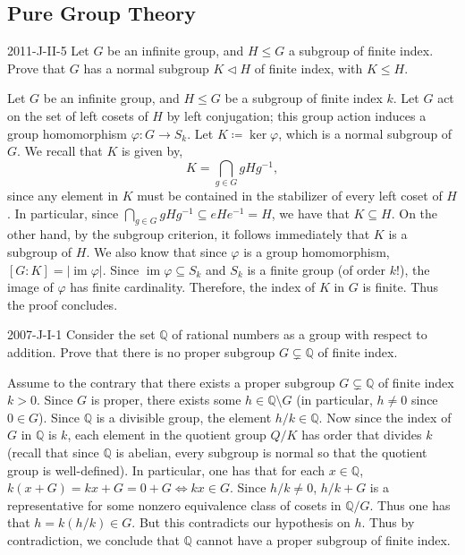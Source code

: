 \documentclass{article}
\begin{document}
	\subsection{Pure Group Theory}
	\begin{prb}{2011-J-II-5}
		Let $G$ be an infinite group, and $H \leq G$ a subgroup of finite index. Prove that $G$ has a normal subgroup $K \triangleleft H$ of finite index, with $K \leq H$. 
	\end{prb}
	Let $G$ be an infinite group, and $H \leq G$ be a subgroup of finite index $k$. Let $G$ act on the set of left cosets of $H$ by left conjugation; this group action induces a group homomorphism $\varphi: G \to S_{k}$. Let $K \coloneqq \ker{\varphi}$, which is a normal subgroup of $G$. We recall that $K$ is given by, 
	\begin{equation*}
		K = \bigcap_{g \in G}gHg^{-1}, 
	\end{equation*}
	since any element in $K$ must be contained in the stabilizer of every left coset of $H$. In particular, since $\bigcap_{g \in G}gHg^{-1} \subseteq eHe^{-1} = H$, we have that $K \subseteq H$. On the other hand, by the subgroup criterion, it follows immediately that $K$ is a subgroup of $H$. We also know that since $\varphi$ is a group homomorphism, $[G:K] = |\operatorname{im}{\varphi}|$. Since $\operatorname{im}{\varphi} \subseteq S_{k}$ and $S_{k}$ is a finite group (of order $k!$), the image of $\varphi$ has finite cardinality. Therefore, the index of $K$ in $G$ is finite. Thus the proof concludes. 
	
	\begin{prb}{2007-J-I-1}
		Consider the set $\mathbb{Q}$ of rational numbers as a group with respect to addition. Prove that there is no proper subgroup $G \subsetneq \mathbb{Q}$ of finite index. 
	\end{prb}
	Assume to the contrary that there exists a proper subgroup $G \subsetneq \mathbb{Q}$ of finite index $k > 0$. Since $G$ is proper, there exists some $h \in \mathbb{Q}\setminus G$ (in particular, $h \neq 0$ since $0 \in G$). Since $\mathbb{Q}$ is a divisible group, the element $h/k \in \mathbb{Q}$. Now since the index of $G$ in $\mathbb{Q}$ is $k$, each element in the quotient group $Q/K$ has order that divides $k$ (recall that since $\mathbb{Q}$ is abelian, every subgroup is normal so that the quotient group is well-defined). In particular, one has that for each $x \in \mathbb{Q}$, $k(x + G) = kx + G = 0 + G \iff kx \in G$. Since $h/k \neq 0$, $h/k + G$ is a representative for some nonzero equivalence class of cosets in $\mathbb{Q}/G$. Thus one has that $h = k(h/k) \in G$. But this contradicts our hypothesis on $h$. Thus by contradiction, we conclude that $\mathbb{Q}$ cannot have a proper subgroup of finite index. 
	
\end{document}
